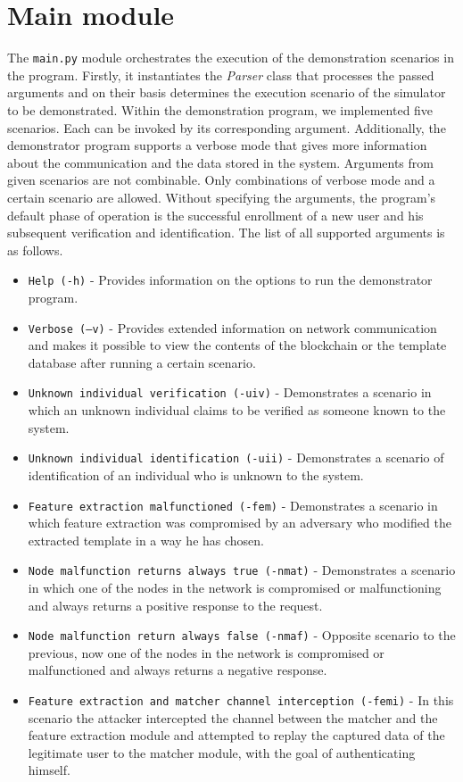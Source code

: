 \section{Main module}
\label{Main module}
The \texttt{main.py} module orchestrates the execution of the demonstration scenarios in the  program. Firstly, it instantiates the \emph{Parser} class that processes the passed arguments and on their basis determines the execution scenario of the simulator to be demonstrated. Within the demonstration program, we implemented five scenarios. Each can be invoked by its corresponding argument. Additionally, the demonstrator program supports a verbose mode that gives more information about the communication and the data stored in the system. Arguments from given scenarios are not combinable. Only combinations of verbose mode and a certain scenario are allowed. Without specifying the arguments, the program's default phase of operation is the successful enrollment of a new user and his subsequent verification and identification. The list of all supported arguments is as follows.
\begin{itemize}
    \item \texttt{Help (-h)} - Provides information on the options to run the demonstrator program. 
    \item \texttt{Verbose (--v)} - Provides extended information on network communication and makes it possible to view the contents of the blockchain or the template database after running a certain scenario.
    \item \texttt{Unknown individual verification (-uiv)} - Demonstrates a scenario in which an unknown individual claims to be verified as someone known to the system.
    \item \texttt{Unknown individual identification (-uii)} - Demonstrates a scenario of identification of an individual who is unknown to the system.
    \item \texttt{Feature extraction malfunctioned (-fem)} - Demonstrates a scenario in which feature extraction was compromised by an adversary who modified the extracted template in a way he has chosen.
    \item \texttt{Node malfunction returns always true (-nmat)} - Demonstrates a scenario in which one of the nodes in the network is compromised or malfunctioning and always returns a positive response to the request.
    \item \texttt{Node malfunction return always false (-nmaf)} - Opposite scenario to the previous, now one of the nodes in the network is compromised or malfunctioned and always returns a negative response.
    \item \texttt{Feature extraction and matcher channel interception (-femi)} - In this scenario the attacker intercepted the channel between the matcher and the feature extraction module and attempted to replay the captured data of the legitimate user to the matcher module, with the goal of authenticating himself.

\end{itemize}
